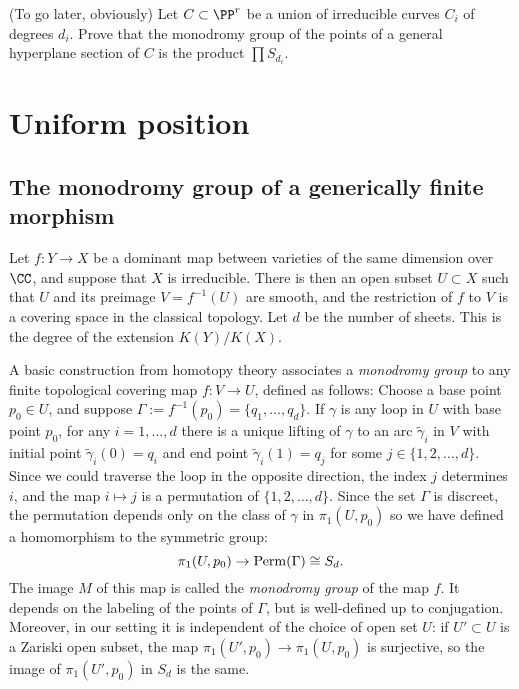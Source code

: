 \begin{exercise}
(To go later, obviously) Let $C \subset \PP^r$ be a union of irreducible curves $C_i$ of degrees $d_i$. Prove that the monodromy group of the points of a general hyperplane section of $C$ is the product $\prod S_{d_i}$.
\end{exercise}

\section{Uniform position} \label{uniformSection}

\subsection{The monodromy group of a generically finite morphism}

Let $f : Y \to X$ be a dominant map between varieties of the same dimension over $\CC$, and suppose that $X$ is irreducible. There is then an open subset $U \subset X$ such that $U$ and 
its preimage $V = f^{-1}(U)$ are smooth, and the restriction of $f$ to $V$ is a covering space in the classical topology. Let $d$ be the number of sheets. This is the degree of the extension $K(Y)/K(X)$.

A basic construction from homotopy theory  associates a \emph{monodromy group} to any finite topological covering map $f : V \to U$, defined as follows: Choose a base point $p_0 \in U$, and suppose $\Gamma := f^{-1}(p_0)  = \{q_1,\dots,q_d\}$. If $\gamma$ is any loop in $U$ with base point $p_0$, for any $i = 1, \dots, d$ there is a unique lifting of $\gamma$ to an arc $\tilde \gamma_i$ in $V$ with initial point $\tilde \gamma_i(0) = q_i$ and end point $\tilde \gamma_i(1) = q_j$ for some $j \in \{1,2,\dots,d\}$. Since we could traverse the loop in the opposite direction, the index $j$ determines $i$, and the map $i\mapsto j$ is a permutation of $\{1,2,\dots,d\}$. 
Since the set $\Gamma$ is discreet, the permutation depends only on the class of $\gamma$ in $\pi_1(U,p_0)$ so we have defined a homomorphism to the symmetric group:
$$
\pi_1(U,p_0)  \to {\rm Perm}(\Gamma) \cong S_d.
$$
The image $M$ of this map is called the \emph{monodromy group} of the map $f$. It depends on the labeling of the points of $\Gamma$, but is well-defined  up to conjugation. Moreover, in our setting it is independent of the choice of open set $U$: if $U' \subset U$ is a Zariski open subset, the map $\pi_1(U', p_0) \to \pi_1(U,p_0)$ is surjective,  so the image of $\pi_1(U', p_0)$ in $S_d$ is the same.


